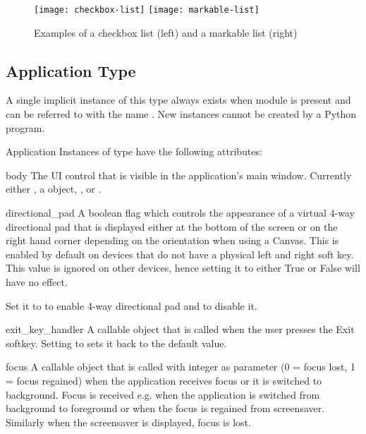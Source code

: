 \begin{figure}[htbp]
\centering
\texttt{[image: checkbox-list]}
\texttt{[image: markable-list]}
\caption{Examples of a checkbox list (left) and a markable list (right)}
\label{fig:checkbox-and-markable-list}
\end{figure}

\subsection{Application Type}
\label{subsec:application}
A single implicit instance of this type always exists when  
module is present and can be referred to with the name . New 
instances cannot be created by a Python program.

\begin{classdesc*}{Application}
Instances of  type have the following attributes:

\begin{memberdesc}[Application]{body}
The UI control that is visible in the application's main window. Currently 
either , a  object, , or 
.
\end{memberdesc}

\begin{memberdesc}[Application]{directional_pad}
A boolean flag which controls the appearance of a virtual 4-way directional pad
that is displayed either at the bottom of the screen or on the right hand corner
depending on the orientation when using a Canvas. This is enabled by default on
devices that do not have a physical left and right soft key. This value is 
ignored on other devices, hence setting it to either True or False will have no effect.

Set it to  to enable 4-way directional pad and  to disable it.
\end{memberdesc}

\begin{memberdesc}[Application]{exit_key_handler}
A callable object that is called when the user presses the Exit softkey. 
Setting  to  sets it back to the 
default value.
\end{memberdesc}

\begin{memberdesc}[Application]{focus}
A callable object that is called with integer as parameter (0 = focus lost, 
1 = focus regained) when the application receives focus or it is switched to 
background. Focus is received e.g. when the application is switched from 
background to foreground or when the focus is regained from screensaver. 
Similarly when the screensaver is displayed, focus is lost.


\end{memberdesc}
\end{classdesc*}
